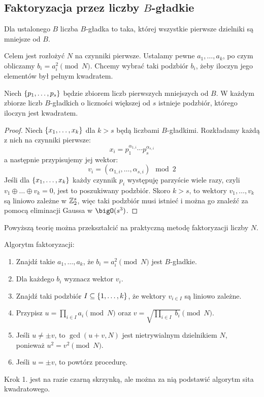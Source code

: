 \subsection{Faktoryzacja przez liczby \( B \)-gładkie}
\begin{definition}
	Dla ustalonego \( B \) liczba \( B \)-gładka to taka, której wszystkie pierwsze dzielniki są mniejsze od \( B \).
\end{definition}

Celem jest rozłożyć \( N \) na czynniki pierwsze. Ustalamy pewne \( a_1, \dots, a_k \), po czym obliczamy \( b_i = a_i^2 \pmod{N} \). Chcemy wybrać taki podzbiór \(b_i \), żeby iloczyn jego elementów był pełnym kwadratem.

\begin{lemma}
	Niech \( \set{p_1, \dots, p_{s}} \) będzie zbiorem liczb pierwszych mniejszych od \( B \). W każdym zbiorze liczb \( B \)-gładkich o liczności większej od \( s \) istnieje podzbiór, którego iloczyn jest kwadratem.
\end{lemma}
\begin{proof}
	Niech \( \set{x_1, \dots, x_k} \) dla \( k > s \) będą liczbami \( B \)-gładkimi. Rozkładamy każdą z nich na czynniki pierwsze:
	\[
		x_i = p_1^{\alpha_{1, i}} \cdots p_s^{\alpha_{s, i}}
	\]
	a następnie przypisujemy jej wektor:
	\[
		v_i = (\alpha_{1, i}, \dots, \alpha_{s, i}) \mod 2
	\]
	Jeśli dla \( \set{x_1, \dots, x_k} \) każdy czynnik \( p_i \) występuję parzyście wiele razy, czyli \( v_1 \oplus \ldots \oplus v_k = 0 \), jest to poszukiwany podzbiór.
	Skoro \( k > s \), to wektory \( v_1, \dots, v_k \) są liniowo zależne w \( \mathbb{Z}_2^{s} \), więc taki podzbiór musi istnieć i można go znaleźć za pomocą eliminacji Gaussa w \( \bigO(s^3) \).
\end{proof}
Powyższą teorię można przekształcić na praktyczną metodę faktoryzacji liczby \( N \).
\begin{greyframe}
	Algorytm faktoryzacji:
	\begin{enumerate}
		\item Znajdź takie \( a_1, \dots, a_k \), że \( b_i = a_i^2 \pmod{N} \) jest \( B \)-gładkie.
		\item Dla każdego \( b_i \) wyznacz wektor \( v_i \).
		\item Znajdź taki podzbiór \( I \subseteq \set{1, \dots, k} \), że wektory \( v_{i \in I} \) są liniowo zależne.
		\item Przypisz \( u = \prod_{i \in I} a_i \pmod{N} \) oraz \( v = \sqrt{\prod_{i \in I}\; b_i} \pmod{N} \).
		\item Jeśli \( u \neq \pm v \), to \( \gcd(u + v, N) \) jest nietrywialnym dzielnikiem \( N \), \\ ponieważ \( u^2 = v^2 \pmod{N} \).
		\item Jeśli \( u = \pm v \), to powtórz procedurę.
	\end{enumerate}
\end{greyframe}
Krok 1. jest na razie czarną skrzynką, ale można za nią podstawić algorytm sita kwadratowego.

